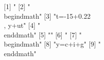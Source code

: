  [1] "%
 [2] "\\begin{dmath}"                                                                                                                                                                                                                                                                                
 [3] "{t}=-15+0.22\\, {y}+{ut}"                                                                                                                                                                                                                                                                      
 [4] "\\end{dmath}"                                                                                                                                                                                                                                                                                  
 [5] ""                                                                                                                                                                                                                                                                                              
 [6] "%
 [7] "\\begin{dmath}"                                                                                                                                                                                                                                                                                
 [8] "{y}={c}+{i}+{g}"                                                                                                                                                                                                                                                                               
 [9] "\\end{dmath}"                                                                                                                                                                                                                                                                                  

